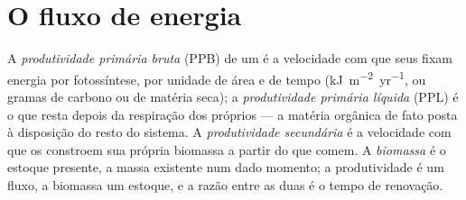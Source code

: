 \section{O fluxo de energia}

\begin{definition}[Produtividade]\label{def:b1:ecosystem-organization:productivity}
A \emph{produtividade primária bruta} (PPB) de um  é a
velocidade com que seus  fixam energia por fotossíntese, por
unidade de área e de tempo (\unit{kJ.m^{-2}.yr^{-1}}, ou gramas de
carbono ou de matéria seca); a \emph{produtividade primária líquida}
(PPL) é o que resta depois da respiração dos próprios  --- a
matéria orgânica de fato posta à disposição do resto do sistema. A
\emph{produtividade secundária} é a velocidade com que os 
constroem sua própria biomassa a partir do que comem. A
\emph{biomassa} é o estoque presente, a massa existente num dado
momento; a produtividade é um fluxo, a biomassa um estoque, e a razão
entre as duas é o tempo de renovação.
\end{definition}


